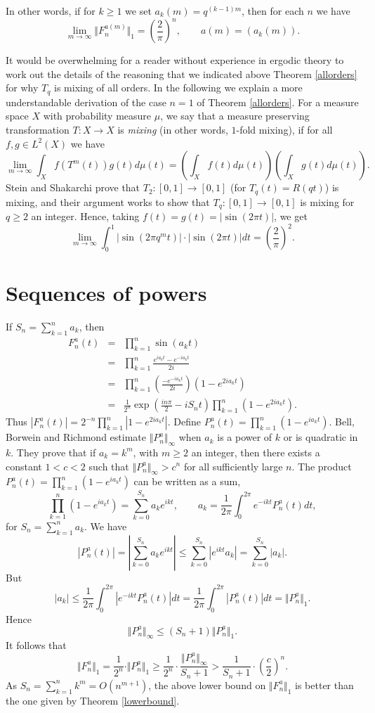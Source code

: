 \documentclass{article}
\newcommand{\norm}[1]{\Vert #1 \Vert}
\begin{document}
In other words, if for $k \geq 1$ we set $a_k(m)=q^{(k-1)m}$, then for each $n$ we have
\[
\lim_{m \to \infty} \norm{F_n^{a(m)}}_1 = \left( \frac{2}{\pi} \right)^n,\qquad a(m)=(a_k(m)).
\]

It would be overwhelming for a reader without experience in ergodic theory to work out the details of the reasoning  that we indicated above Theorem \ref{allorders}
for why $T_q$ is mixing of all orders. In the following we explain a more understandable derivation of the case $n=1$ of Theorem \ref{allorders}.
For a measure space $X$ with probability measure $\mu$, we say that a measure preserving transformation
$T:X \to X$ is {\em mixing} (in other words, $1$-fold mixing), if for all $f,g \in L^2(X)$ we have
\[
\lim_{m \to \infty} \int_X f\left(T^m(t)\right)g(t) d\mu(t)=\left(\int_X f(t) d\mu(t) \right) \left( \int_X g(t) d\mu(t) \right).
\]
Stein and Shakarchi \cite[p.~305]{steinIII} prove that $T_2:[0,1] \to[0,1]$ (for $T_q(t)=R(qt)$)
is mixing, and their argument works to show that
$T_q:[0,1] \to [0,1]$ is mixing for $q \geq 2$ an integer. Hence, taking $f(t)=g(t)=|\sin(2\pi t)|$, we get
\[
\lim_{m \to \infty} \int_0^1 |\sin(2\pi q^m t)| \cdot |\sin(2\pi t)| dt=\left( \frac{2}{\pi} \right)^2.
\]

\section{Sequences of powers}
If $S_n=\sum_{k=1}^n a_k$, then
\begin{eqnarray*}
F_n^a(t)&=&\prod_{k=1}^n \sin(a_k t)\\
&=&\prod_{k=1}^n \frac{e^{ia_kt}-e^{-ia_kt}}{2i}\\
&=&\prod_{k=1}^n \left(\frac{-e^{-ia_kt}}{2i} \right) \left(1-e^{2ia_kt} \right)\\
&=&\frac{1}{2^n} \exp\left(\frac{in\pi}{2} -iS_nt \right) \prod_{k=1}^n \left(1-e^{2ia_kt} \right).
\end{eqnarray*}
Thus $|F_n^a(t)|=2^{-n}  \prod_{k=1}^n \left | 1-e^{2ia_kt} \right |$. Define $P_n^a(t)=
\prod_{k=1}^n \left( 1-e^{ia_kt} \right)$.
Bell, Borwein and Richmond \cite{MR1654470} estimate $\norm{P_n^a}_\infty$ when $a_k$ is a power of $k$ or is quadratic in $k$.
They prove that if $a_k=k^m$, with $m \geq 2$ an integer, then there exists a constant $1<c<2$ such that
$\norm{P_n^a}_\infty>c^n$ for all sufficiently large $n$.
The product $P_n^a(t)=\prod_{k=1}^n (1-e^{ia_kt})$ can be written as a sum,
\[
\prod_{k=1}^n (1-e^{ia_kt})=\sum_{k=0}^{S_n} a_k e^{ikt}, \qquad a_k=\frac{1}{2\pi} \int_0^{2\pi} e^{-ikt} P_n^a(t) dt,
\]
for $S_n=\sum_{k=1}^n a_k$. We have
\[
|P_n^a(t)|=\left| \sum_{k=0}^{S_n} a_k e^{ikt} \right| \leq \sum_{k=0}^{S_n} |e^{ikt} a_k| = \sum_{k=0}^{S_n} |a_k|.
\]
But
\[
|a_k|  \leq \frac{1}{2\pi} \int_0^{2\pi} \left| e^{-ikt} P_n^a(t) \right| dt
=\frac{1}{2\pi} \int_0^{2\pi} |P_n^a(t)| dt=\norm{P_n^a}_1.
\]
Hence
\[
\norm{P_n^a}_\infty \leq (S_n+1) \norm{P_n^a}_1.
\]
It follows that
\[
\norm{F_n^a}_1 = \frac{1}{2^n}\cdot  \norm{P_n^a}_1  \geq  \frac{1}{2^n}\cdot \frac{\norm{P_n^a}_\infty}{S_n+1}
>\frac{1}{S_n+1} \cdot \left(\frac{c}{2} \right)^n.
\]
As $S_n=\sum_{k=1}^n k^m=O(n^{m+1})$, the above lower bound on $\norm{F_n^a}_1$ is better than the one given by Theorem \ref{lowerbound}.



\end{document}
